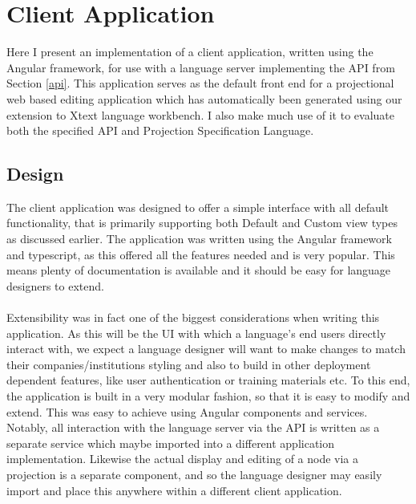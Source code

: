 \documentclass{article}
\begin{document}
\section{Client Application}\label{clientApp}
Here I present an implementation of a client application, written using the Angular framework, for use with a language server implementing the API from Section \ref{api}. This application serves as the default front end for a projectional web based editing application which has automatically been generated using our extension to Xtext language workbench. I also make much use of it to evaluate both the specified API and Projection Specification Language. 

\subsection{Design}
The client application was designed to offer a simple interface with all default functionality, that is primarily  supporting both Default and Custom view types as discussed earlier. The application was written using the Angular framework and typescript, as this offered all the features needed and is very popular. This means plenty of documentation is available and it should be easy for language designers to extend.
\\
\\
Extensibility was in fact one of the biggest considerations when writing this application. As this will be the UI with which a language's end users directly interact with, we expect a language designer will want to make changes to match their companies/institutions styling and also to build in other  deployment dependent features, like user authentication or training materials etc. To this end, the application is built in a very modular fashion, so that it is easy to modify and extend. This was easy to achieve using Angular components and services. Notably, all interaction with the language server via the API is written as a separate service which maybe imported into a different application implementation. Likewise the actual display and editing of a node via a projection is a separate component, and so the language designer may easily import and place this anywhere within a different client application.
\end{document}
